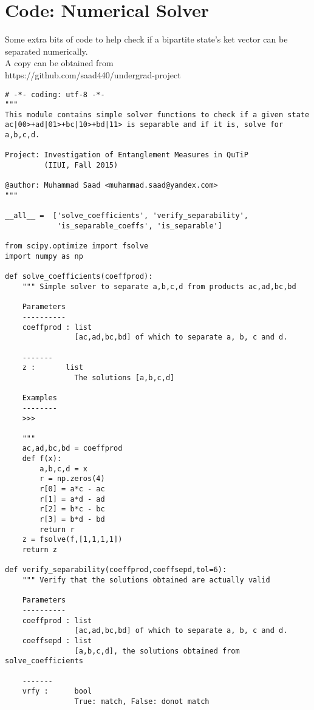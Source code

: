 \chapter{Code: Numerical Solver}

Some extra bits of code to help check if a bipartite state's ket vector can be separated numerically.\\
A copy can be obtained from\\
https://github.com/saad440/undergrad-project 

\begin{verbatim}
# -*- coding: utf-8 -*-
"""
This module contains simple solver functions to check if a given state
ac|00>+ad|01>+bc|10>+bd|11> is separable and if it is, solve for a,b,c,d.

Project: Investigation of Entanglement Measures in QuTiP
         (IIUI, Fall 2015)

@author: Muhammad Saad <muhammad.saad@yandex.com>
"""

__all__ =  ['solve_coefficients', 'verify_separability',
            'is_separable_coeffs', 'is_separable']

from scipy.optimize import fsolve
import numpy as np

def solve_coefficients(coeffprod):
    """ Simple solver to separate a,b,c,d from products ac,ad,bc,bd
    
    Parameters
    ----------
    coeffprod : list
                [ac,ad,bc,bd] of which to separate a, b, c and d.
    
    -------
    z :       list
                The solutions [a,b,c,d]

    Examples
    --------
    >>> 
    
    """
    ac,ad,bc,bd = coeffprod
    def f(x):
        a,b,c,d = x
        r = np.zeros(4)
        r[0] = a*c - ac
        r[1] = a*d - ad
        r[2] = b*c - bc
        r[3] = b*d - bd
        return r
    z = fsolve(f,[1,1,1,1])
    return z

def verify_separability(coeffprod,coeffsepd,tol=6):
    """ Verify that the solutions obtained are actually valid
    
    Parameters
    ----------
    coeffprod : list
                [ac,ad,bc,bd] of which to separate a, b, c and d.
    coeffsepd : list
                [a,b,c,d], the solutions obtained from solve_coefficients
    
    -------
    vrfy :      bool
                True: match, False: donot match
    

\end{verbatim}
